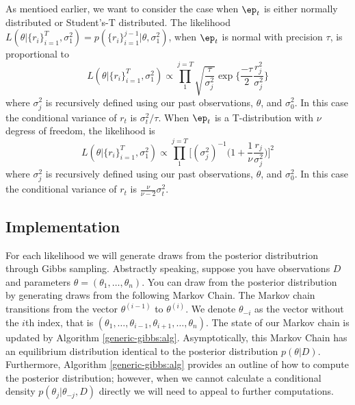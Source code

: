 \documentclass{article}
\begin{document}
As mentioed earlier, we want to consider the case when $\ep_t$ is either normally distributed or Student's-T distributed.  The likelihood $L(\theta | \{r_i\}_{i=1}^{T}, \sigma_1^2) = p(\{r_i\}_{i=1}^{j-1} | \theta, \sigma_1^2)$, when $\ep_t$ is normal with precision $\tau$, is proportional to
\[
L(\theta | \{r_i\}_{i=1}^{T}, \sigma_1^2) 
\propto \prod_{1}^{j=T} \sqrt{\frac{\tau}{\sigma_j^2}} \exp \Big\{ \frac{-\tau}{2} \frac{r_j^2}{\sigma_j^2} \Big\}
\]
where $\sigma_j^2$ is recursively defined using our past observations, $\theta$, and $\sigma_0^2$.  In this case the conditional variance of $r_t$ is $\sigma_t^2 / \tau$.  
When $\ep_t$ is a T-distribution with $\nu$ degress of freedom, the likelihood is
\[
L(\theta | \{r_i\}_{i=1}^{T}, \sigma_1^2) 
\propto \prod_{1}^{j=T} \Big[ (\sigma_j^2)^{-1} \Big( 1 + \frac{1}{\nu} \frac{r_j}{\sigma_j^2} \Big) \Big]^2
\]
where $\sigma_j^2$ is recursively defined using our past observations, $\theta$, and $\sigma_0^2$.  In this case the conditional variance of $r_t$ is $\frac{\nu}{\nu-2} \sigma_t^2$.

\subsection{Implementation}

For each likelihood we will generate draws from the posterior distributrion through Gibbs sampling.  Abstractly speaking, suppose you have observations $D$ and parameters $\theta = (\theta_1, \ldots, \theta_n)$.  You can draw from the posterior distribution by generating draws from the following Markov Chain.  The Markov chain transitions from the vector $\theta^{(i-1)}$ to $\theta^{(i)}$.  We denote $\theta_{-i}$ as the vector without the $i$th index, that is $(\theta_1, \ldots, \theta_{i-1}, \theta_{i+1}, \ldots, \theta_n)$.  The state of our Markov chain is updated by Algorithm \ref{generic-gibbs:alg}.  Asymptotically, this Markov Chain has an equilibrium distribution identical to the posterior distribution $p(\theta | D)$.  Furthermore, Algorithm \ref{generic-gibbs:alg} provides an outline of how to compute the posterior distribution; however, when we cannot calculate a conditional density $p(\theta_j | \theta_{-j}, D)$ directly we will need to appeal to further computations.

\begin{comment}
\begin{description}
\item[1:] Set $i = 0$ and $\theta^{i}$ to vector..
\item[2:] Draw $\theta_1$ from $p(\theta_1 | \theta_{-1}, D)$ 
\item[3:] Draw $\theta_2$ from $p(\theta_2 | \theta_{-2}, D)$
\item $\cdots$
\item[$n$+1:] Draw $\theta_n$ from $p(\theta_n | \theta_{-n}, D)$.
\item[$n$+2:] Set $theta^{(i+1)} = \theta$.
\item[$n$+3:] Go back to step 
\end{description}
\end{comment}
\end{document}

